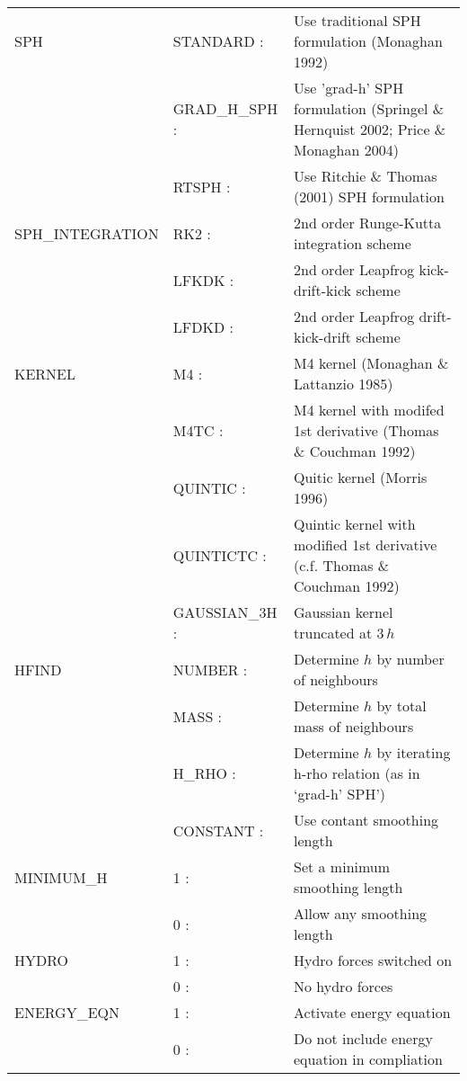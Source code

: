 \documentclass[a4paper]{article}
\begin{document}
\begin{center}
\begin{supertabular}{|p{4.6cm}|p{4.6cm} p{6.4cm}|}
 SPH           & STANDARD       :& Use traditional SPH formulation (Monaghan 1992) \\
               & GRAD\_H\_SPH   :& Use 'grad-h' SPH formulation (Springel \& Hernquist 2002; Price \& Monaghan 2004) \\ 
               & RTSPH          :& Use Ritchie \& Thomas (2001) SPH formulation \\ \hline

 SPH\_INTEGRATION & RK2   :& 2nd order Runge-Kutta integration scheme \\
                  & LFKDK :& 2nd order Leapfrog kick-drift-kick scheme \\
                  & LFDKD :& 2nd order Leapfrog drift-kick-drift scheme \\ \hline

 KERNEL        & M4      :& M4 kernel (Monaghan \& Lattanzio 1985) \\
               & M4TC    :& M4 kernel with modifed 1st derivative (Thomas \& Couchman 1992) \\ 
               & QUINTIC :& Quitic kernel (Morris 1996) \\
               & QUINTICTC :& Quintic kernel with modified 1st derivative (c.f. Thomas \& Couchman 1992) \\
               & GAUSSIAN\_3H :& Gaussian kernel truncated at $3\,h$ \\ \hline

 HFIND         & NUMBER   :& Determine $h$ by number of neighbours \\
               & MASS     :& Determine $h$ by total mass of neighbours \\ 
               & H\_RHO   :& Determine $h$ by iterating h-rho relation (as in `grad-h' SPH') \\
               & CONSTANT :& Use contant smoothing length \\ \hline

 MINIMUM\_H    & 1 :& Set a minimum smoothing length \\
               & 0 :& Allow any smoothing length \\ \hline

 HYDRO         & 1 :& Hydro forces switched on \\
               & 0 :& No hydro forces \\ \hline

 ENERGY\_EQN   & 1 :& Activate energy equation \\
               & 0 :& Do not include energy equation in compliation \\ \hline


\end{supertabular}
\end{center}
\end{document}
